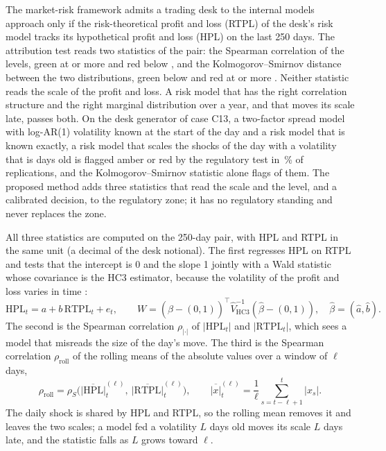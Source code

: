 The market-risk framework admits a trading desk to the internal models approach only if the risk-theoretical profit and loss (RTPL) of the desk's risk model tracks its hypothetical profit and loss
(HPL) on the last 250 days. The attribution test reads two statistics of the pair: the Spearman correlation of the levels, green at \pxThirteenSpGreen{} or more and red below \pxThirteenSpRed{}, and the
Kolmogorov--Smirnov distance between the two distributions, green below \pxThirteenKsGreen{} and red at \pxThirteenKsRed{} or more \citep{market:bcbsmar32}. Neither statistic reads the scale of the profit and loss. A risk model that has the right
correlation structure and the right marginal distribution over a year, and that moves its scale late, passes both. On the desk generator of case C13, a two-factor spread model with log-AR(1) volatility known at the start of the day and a risk model that
is known exactly, a risk model that scales the shocks of the day with a volatility that is \pxThirteenVolLag{} days old is flagged amber or red by the regulatory test in \pxThirteenPla{}\,\% of \pxThirteenN{} replications, and the
Kolmogorov--Smirnov statistic alone flags \pxThirteenKsFlag{} of them. The proposed method adds three statistics that read the scale and the level, and a calibrated decision, to the regulatory zone; it has no regulatory standing and never replaces the zone.

All three statistics are computed on the 250-day pair, with HPL and RTPL in the same unit (a decimal of the desk notional). The first regresses HPL on RTPL and tests that the intercept is 0 and the slope 1 jointly with a Wald statistic whose covariance is the HC3
estimator, because the volatility of the profit and loss varies in time \citep{proposed:mackinnon1985}:
\begin{equation}
\mathrm{HPL}_t=a+b\,\mathrm{RTPL}_t+e_t,\qquad W=(\hat\beta-(0,1))^{\top}\hat V_{\mathrm{HC3}}^{-1}(\hat\beta-(0,1)),\quad \hat\beta=(\hat a,\hat b).
\label{eq:bs13-wald}
\end{equation}
The second is the Spearman correlation $\rho_{|\cdot|}$ of $|\mathrm{HPL}_t|$ and $|\mathrm{RTPL}_t|$, which sees a model that misreads the size of the day's move. The third is the Spearman correlation $\rho_{\mathrm{roll}}$ of the rolling means of the absolute values over a window of $\ell$ days,
\begin{equation}
\rho_{\mathrm{roll}}=\rho_{S}\Big(\overline{|\mathrm{HPL}|}_{t}^{(\ell)},\ \overline{|\mathrm{RTPL}|}_{t}^{(\ell)}\Big),\qquad \overline{|x|}_{t}^{(\ell)}=\frac1\ell\sum_{s=t-\ell+1}^{t}|x_s|.
\label{eq:bs13-roll}
\end{equation}
The daily shock is shared by HPL and RTPL, so the rolling mean removes it and leaves the two scales; a model fed a volatility $L$ days old moves its scale $L$ days late, and the statistic falls as $L$ grows toward $\ell$.

